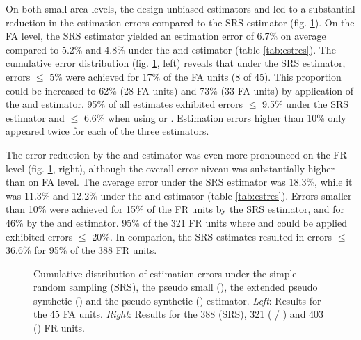 On both small area levels, the design-unbiased estimators \psmall{} and \extpsynth{} led to a substantial reduction in the estimation errors compared to the SRS estimator (fig. \ref{fig:disterrors}). On the FA level, the SRS estimator yielded an estimation error of 6.7\% on average compared to 5.2\% and 4.8\% under the \extpsynth{} and \psmall{} estimator (table \ref{tab:estres}). The cumulative error distribution (fig. \ref{fig:disterrors}, left) reveals that under the SRS estimator, errors $\leq$ 5\% were achieved for 17\% of the FA units (8 of 45). This proportion could be increased to 62\% (28 FA units) and 73\% (33 FA units) by application of the \psmall{} and \extpsynth{} estimator. 95\% of all estimates exhibited errors $\leq$ 9.5\% under the SRS estimator and $\leq$ 6.6\% when using \psmall{} or \extpsynth{}. Estimation errors higher than 10\% only appeared twice for each of the three estimators.\par
The error reduction by the \psmall{} and \extpsynth{} estimator was even more pronounced on the FR level (fig. \ref{fig:disterrors}, right), although the overall error niveau was substantially higher than on FA level. The average error under the SRS estimator was 18.3\%, while it was 11.3\% and 12.2\% under the \psmall{} and \extpsynth{} estimator (table \ref{tab:estres}). Errors smaller than 10\% were achieved for 15\% of the FR units by the SRS estimator, and for 46\% by the \psmall{} and \psynth{} estimator. 95\% of the 321 FR units where \psmall{} and \extpsynth{} could be applied exhibited errors $\leq$ 20\%. In comparion, the SRS estimates resulted in errors $\leq$ 36.6\% for 95\% of the 388 FR units.

\begin{figure}[H]
	\centering
	\caption{Cumulative distribution of estimation errors under the simple random sampling (SRS), the pseudo small (\psmall{}), the extended pseudo synthetic (\extpsynth{}) and the pseudo synthetic (\psynth{}) estimator. \textit{Left}: Results for the 45 FA units. \textit{Right}: Results for the 388 (SRS), 321 (\psmall{} / \extpsynth{}) and 403 (\psynth{}) FR units.}
	\label{fig:disterrors}
\end{figure}

